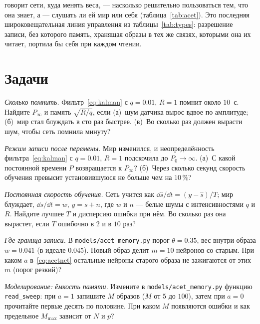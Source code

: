  говорит сети, куда менять веса,  --- насколько решительно пользоваться тем, что она знает, а  --- слушать ли ей мир или себя (таблица~\ref{tab:acet}). Это последняя широковещательная линия управления из таблицы~\ref{tab:types}: разрешение записи, без которого память, хранящая образы в тех же связях, которыми она их читает, портила бы себя при каждом чтении.

\section{Задачи}

\begin{exercise}[\lvlA]
\label{ex:09:1}
\emph{Сколько помнить.} Фильтр~\eqref{eq:kalman} с $q=0.01$, $R=1$ помнит около $10$~с. Найдите $P_\infty$ и память $\sqrt{R/q}$, если (а)~шум датчика вырос вдвое по амплитуде; (б)~мир стал блуждать в сто раз быстрее. (в)~Во сколько раз должен вырасти шум, чтобы сеть помнила минуту?
\end{exercise}

\begin{exercise}[\lvlB]
\label{ex:09:2}
\emph{Режим записи после перемены.} Мир изменился, и неопределённость фильтра~\eqref{eq:kalman} с $q=0.01$, $R=1$ подскочила до $P_0\to\infty$. (а)~С какой постоянной времени $P$ возвращается к $P_\infty$? (б)~Через сколько секунд скорость обучения превысит установившуюся не больше чем на $10\,\%$?
\end{exercise}

\begin{exercise}[\lvlB]
\label{ex:09:3}
\emph{Постоянная скорость обучения.} Сеть учится как $\dd\hat s/\dd t=(y-\hat s)/T$; мир блуждает, $\dd s/\dd t=w$, $y=s+n$, где $w$ и $n$ --- белые шумы с интенсивностями $q$ и $R$. Найдите лучшее $T$ и дисперсию ошибки при нём. Во сколько раз она вырастет, если $T$ ошибочно в $2$ и в $10$ раз?
\end{exercise}

\begin{exercise}[\lvlB]
\label{ex:09:4}
\emph{Где граница записи.} В \texttt{models/\allowbreak acet\_memory.py} порог $\theta=0.35$, вес внутри образа $w=0.041$ (в идеале $0.045$). Новый образ делит $m=10$ нейронов со старым. При каком $a$ в~\eqref{eq:acetnet} остальные нейроны старого образа не зажигаются от этих $m$ (порог резкий)?
\end{exercise}

\begin{exercise}[\lvlB]
\label{ex:09:5}
\emph{Моделирование: ёмкость памяти.} Измените в \texttt{models/\allowbreak acet\_memory.py} функцию \texttt{read\_sweep}: при $a=1$ запишите $M$ образов ($M$ от $5$ до $100$), затем при $a=0$ прочитайте первые десять по половине. При каком $M$ появляются ошибки и как предельное $M_{\max}$ зависит от $N$ и $p$?
\end{exercise}

